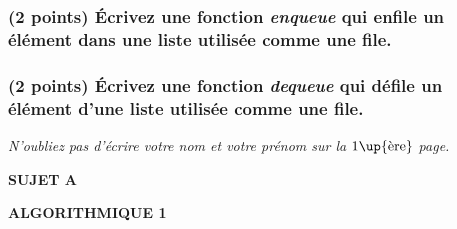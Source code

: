 \documentclass[11pt,a4paper]{article}
\newcommand{\TitreMatiere}{Algorithmique 1}
\begin{document}
\medskip

\subsubsection{(2 points) \'Ecrivez une fonction \og \textit{enqueue} \fg{} qui enfile un élément dans une liste utilisée comme une file. }

\begin{center}
\end{center}


\subsubsection{(2 points) \'Ecrivez une fonction \og \textit{dequeue} \fg{} qui défile un élément d'une liste utilisée comme une file. }

\begin{center}
\end{center}



\vfillFirst

\begin{center}
\textit{N'oubliez pas d'écrire votre nom et votre prénom sur la $1\up{\text{ère}}$ page.}
\end{center}

\vfillLast


\clearpage



\vfillFirst

\begin{center}

\begin{LARGE}
\textbf{SUJET A}

\bigskip

\textbf{\MakeUppercase{\TitreMatiere}}
\end{LARGE}

\end{center}

\vfillLast
\end{document}

